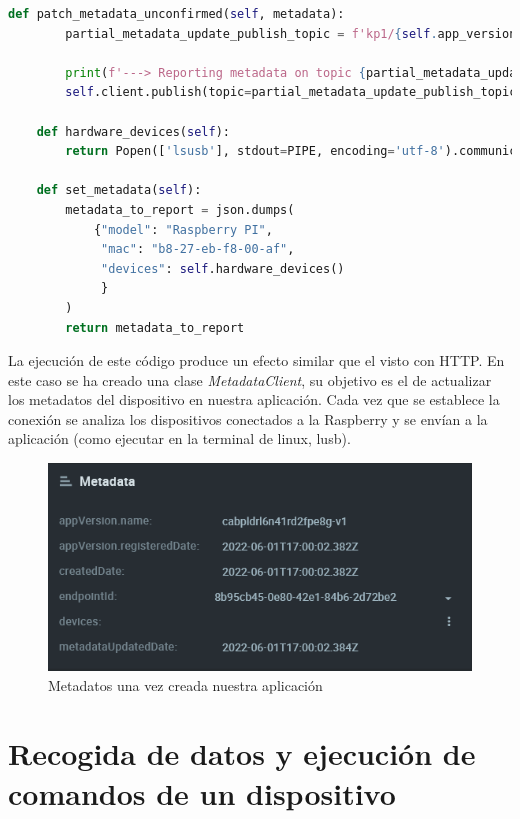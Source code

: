 \begin{lstlisting}[language=Python]
    def patch_metadata_unconfirmed(self, metadata):
        partial_metadata_update_publish_topic = f'kp1/{self.app_version}/epmx/{self.endpoint_token}/update/keys'

        print(f'---> Reporting metadata on topic {partial_metadata_update_publish_topic}\nwith payload {metadata}')
        self.client.publish(topic=partial_metadata_update_publish_topic, payload=metadata)

    def hardware_devices(self):
        return Popen(['lsusb'], stdout=PIPE, encoding='utf-8').communicate()[0]

    def set_metadata(self):
        metadata_to_report = json.dumps(
            {"model": "Raspberry PI",
             "mac": "b8-27-eb-f8-00-af",
             "devices": self.hardware_devices()
             }
        )
        return metadata_to_report

\end{lstlisting}

La ejecución de este código produce un efecto similar que el visto con HTTP. En este caso se ha creado una clase \textit{MetadataClient}, su objetivo es el de actualizar los metadatos del dispositivo en nuestra aplicación. Cada vez que se establece la conexión se analiza los dispositivos conectados a la Raspberry y se envían a la aplicación (como ejecutar en la terminal de linux, lusb).


\begin{figure}[p]
    \centering
    \includegraphics[width=\linewidth]{imagenes/metadata-old.png}
    \caption{Metadatos una vez creada nuestra aplicación}
    \label{fig:figure11}
\end{figure}


\section{Recogida de datos y ejecución de comandos de un dispositivo}


